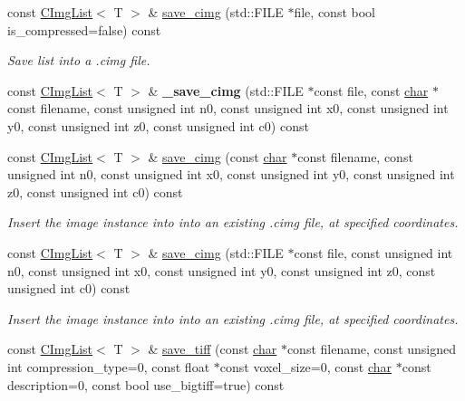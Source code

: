 \begin{DoxyCompactItemize}
\item 
const \hyperlink{structcimg__library__suffixed_1_1CImgList}{C\+Img\+List}$<$ T $>$ \& \hyperlink{structcimg__library__suffixed_1_1CImgList_ab6686d16f57cd89b76c2a87ef76c067e}{save\+\_\+cimg} (std\+::\+F\+I\+LE $\ast$file, const bool is\+\_\+compressed=false) const
\begin{DoxyCompactList}\small\item\em Save list into a .cimg file. \end{DoxyCompactList}\item 
\mbox{\label{structcimg__library__suffixed_1_1CImgList_adda819ef9e6b4584138999daed6b7048}} 
const \hyperlink{structcimg__library__suffixed_1_1CImgList}{C\+Img\+List}$<$ T $>$ \& {\bfseries \+\_\+save\+\_\+cimg} (std\+::\+F\+I\+LE $\ast$const file, const \hyperlink{classchar}{char} $\ast$const filename, const unsigned int n0, const unsigned int x0, const unsigned int y0, const unsigned int z0, const unsigned int c0) const
\item 
const \hyperlink{structcimg__library__suffixed_1_1CImgList}{C\+Img\+List}$<$ T $>$ \& \hyperlink{structcimg__library__suffixed_1_1CImgList_aa43477599690ded555be8b24d3043a2c}{save\+\_\+cimg} (const \hyperlink{classchar}{char} $\ast$const filename, const unsigned int n0, const unsigned int x0, const unsigned int y0, const unsigned int z0, const unsigned int c0) const
\begin{DoxyCompactList}\small\item\em Insert the image instance into into an existing .cimg file, at specified coordinates. \end{DoxyCompactList}\item 
const \hyperlink{structcimg__library__suffixed_1_1CImgList}{C\+Img\+List}$<$ T $>$ \& \hyperlink{structcimg__library__suffixed_1_1CImgList_a26c663102c190a91d32a79ca9c26f460}{save\+\_\+cimg} (std\+::\+F\+I\+LE $\ast$const file, const unsigned int n0, const unsigned int x0, const unsigned int y0, const unsigned int z0, const unsigned int c0) const
\begin{DoxyCompactList}\small\item\em Insert the image instance into into an existing .cimg file, at specified coordinates. \end{DoxyCompactList}\item 
const \hyperlink{structcimg__library__suffixed_1_1CImgList}{C\+Img\+List}$<$ T $>$ \& \hyperlink{structcimg__library__suffixed_1_1CImgList_a62700a17bb0af63522c732b9d1a15325}{save\+\_\+tiff} (const \hyperlink{classchar}{char} $\ast$const filename, const unsigned int compression\+\_\+type=0, const float $\ast$const voxel\+\_\+size=0, const \hyperlink{classchar}{char} $\ast$const description=0, const bool use\+\_\+bigtiff=true) const

\end{DoxyCompactItemize}
